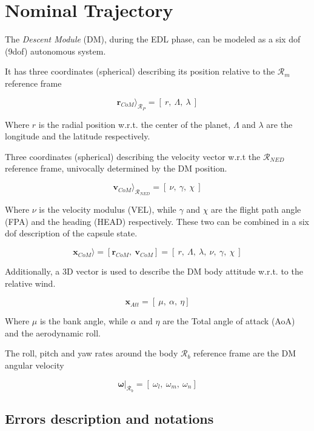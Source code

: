 \chapter{Nominal Trajectory}

The \textit{Descent Module} (DM), during the EDL phase, can be modeled as a
six dof (9dof) autonomous system.

It has three coordinates (spherical) describing its position relative to the
$\mathcal{R}_{m}$ reference frame

        $$
            \textbf{r}_{CoM}\rangle_{\mathcal{R}_{P}} = [\: r,\:\Lambda,\:\lambda \:]
        $$

\noindent Where $r$ is the radial position w.r.t. the center of the planet, $\Lambda$ and $\lambda$ are 
the longitude and the latitude respectively.

Three coordinates (spherical) describing the velocity vector w.r.t the $\mathcal{R}_{NED}$ reference frame, univocally
determined by the DM position.

        $$
            \textbf{v}_{CoM}\rangle_{\mathcal{R}_{NED}} = [\: \nu,\:\gamma,\:\chi \:]
        $$

\noindent Where $\nu$ is the velocity modulus (VEL), while $\gamma$ and $\chi$ are the flight
path angle (FPA) and the heading (HEAD) respectively.
These two can be combined in a six dof description of the capsule state.

        $$
            \textbf{x}_{CoM}\rangle = [\textbf{r}_{CoM},\: \textbf{v}_{CoM}] = [\: r,\:\Lambda,\:\lambda, \: \nu,\:\gamma,\:\chi \:]
        $$

Additionally, a 3D vector is used to describe the DM body attitude w.r.t. to the relative wind.

        $$
            \textbf{x}_{Att} = [\: \mu,\: \alpha,\: \eta]
        $$

\noindent Where $\mu$ is the bank angle, while $\alpha$ and $\eta$ are the Total 
angle of attack (AoA) and the aerodynamic roll.

The roll, pitch and yaw rates around the body $\mathcal{R}_{b}$ reference frame are the DM angular velocity

        $$
            \boldsymbol{\omega}|_{\mathcal{R}_{b}} = [\: \omega_l,\: \omega_m,\: \omega_n]
        $$

\newpage

\section{Errors description and notations}

